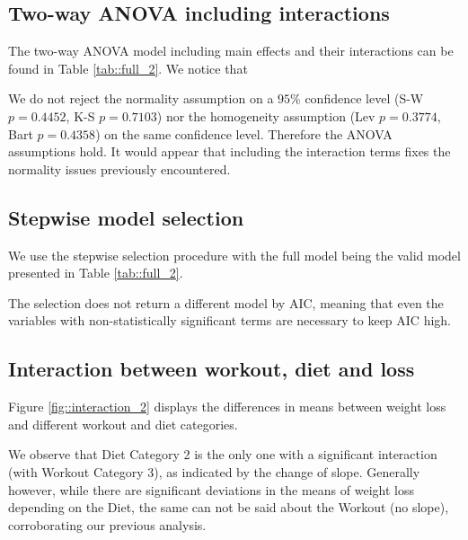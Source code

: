 \documentclass[12pt, a4paper]{article}
\begin{document}
	
	\subsection{Two-way ANOVA including interactions}
	
	The two-way ANOVA model including main effects and their interactions can be found in Table \ref{tab::full_2}. We notice that 
	
	
	
	We do not reject the normality assumption on a $95\%$ confidence level (S-W $p=0.4452$, K-S $p=0.7103$) nor the homogeneity assumption (Lev $p=0.3774$, Bart $p=0.4358$) on the same confidence level. Therefore the ANOVA assumptions hold. It would appear that including the interaction terms fixes the normality issues previously encountered.
		
		
		
	\subsection{Stepwise model selection}
	
	We use the stepwise selection procedure with the full model being the valid model presented in Table \ref{tab::full_2}.
	
	The selection does not return a different model by AIC, meaning that even the variables with non-statistically significant terms are necessary to keep AIC high.
	
	
	\subsection{Interaction between workout, diet and loss }
	
	Figure \ref{fig::interaction_2} displays the differences in means between weight loss and different workout and diet categories.
	
	We observe that Diet Category 2 is the only one with a significant interaction (with Workout Category 3), as indicated by the change of slope. Generally however, while there are significant deviations in the means of weight loss depending on the Diet, the same can not be said about the Workout (no slope), corroborating our previous analysis.
	
\end{document}
